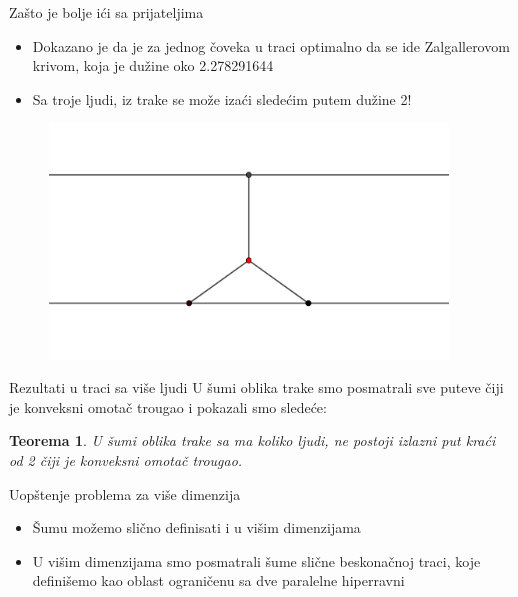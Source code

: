\documentclass[12pt]{beamer}
\newtheorem{thm}{Teorema}[section]
\theoremstyle{definition}
\theoremstyle{remark}
\theoremstyle{plain}
\begin{document}
\begin{frame}{Za\v sto je bolje i\' ci sa prijateljima}
\begin{itemize}
\item Dokazano je da je za jednog \v coveka u traci optimalno da se ide Zalgallerovom krivom, koja je du\v zine oko 2.278291644
\pause
\item Sa troje ljudi, iz trake se mo\v ze iza\' ci slede\' cim putem du\v zine 2!
\end{itemize}


\begin{figure}
\begin{center}
\includegraphics[width=300pt]{trougao.png}
\end{center}
\end{figure}

\end{frame}

\begin{frame}{Rezultati u traci sa vi\v se ljudi}
U \v sumi oblika trake smo posmatrali sve puteve \v ciji je konveksni omota\v c trougao i pokazali smo slede\' ce:
\bigskip
\begin{thm}
U \v sumi oblika trake sa ma koliko ljudi, ne postoji izlazni put kra\' ci od 2 \v ciji je konveksni omota\v c trougao.
\end{thm}
\end{frame}

\begin{frame}{Uop\v stenje problema za vi\v se dimenzija}
\begin{itemize}
\item \v Sumu mo\v zemo sli\v cno definisati i u vi\v sim dimenzijama
\pause
\item U vi\v sim dimenzijama smo posmatrali \v sume sli\v cne beskona\v cnoj traci, koje defini\v semo kao oblast ograni\v cenu sa dve paralelne hiperravni
\end{itemize}
\end{frame}
\end{document}
